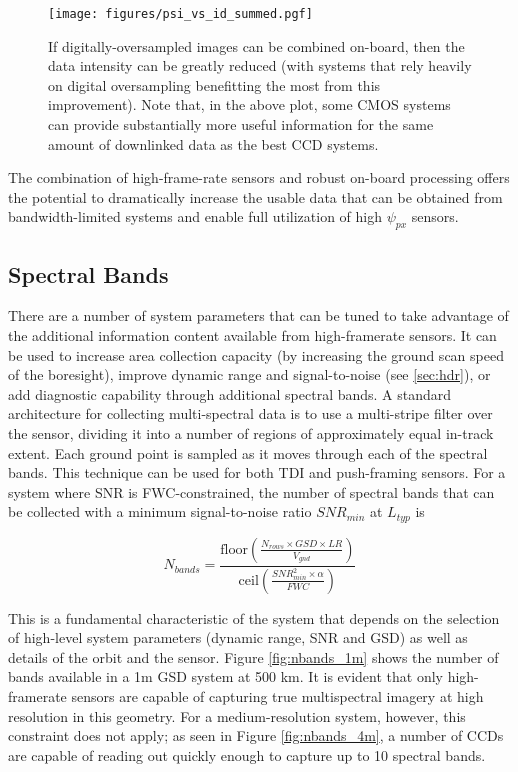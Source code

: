 \documentclass[10pt,journal]{IEEEtran}  %
\begin{document}
\begin{figure}
  \texttt{[image: figures/psi\_vs\_id\_summed.pgf]}
  \caption{If digitally-oversampled images can be combined on-board, then the data intensity can be greatly reduced (with systems that rely heavily on digital oversampling benefitting the most from this improvement). Note that, in the above plot, some CMOS systems can provide substantially more useful information for the same amount of downlinked data as the best CCD systems.
  \label{fig:psi_vs_id_summed}}
\end{figure}

The combination of high-frame-rate sensors and robust on-board processing offers the potential to dramatically increase the usable data that can be obtained from bandwidth-limited systems and enable full utilization of high $\psi_{px}$ sensors.

\subsection{Spectral Bands}
\label{sec:spec}

There are a number of system parameters that can be tuned to take advantage of the additional information content available from high-framerate sensors. It can be used to increase area collection capacity (by increasing the ground scan speed of the boresight), improve dynamic range and signal-to-noise (see \ref{sec:hdr}), or add diagnostic capability through additional spectral bands. A standard architecture for collecting multi-spectral data is to use a multi-stripe filter over the sensor, dividing it into a number of regions of approximately equal in-track extent. Each ground point is sampled as it moves through each of the spectral bands. This technique can be used for both TDI and push-framing sensors. For a system where SNR is FWC-constrained, the number of spectral bands that can be collected with a minimum signal-to-noise ratio $SNR_{min}$ at $L_{typ}$ is

\begin{equation}
    \label{eq:nbands}
    N_{bands} = \frac{\text{floor}\left(\frac{N_{rows}\times GSD\times LR}{V_{gnd}}\right)} {\text{ceil}\left(\frac{SNR_{min}^{2}\times\alpha}{FWC}\right)}
\end{equation}

This is a fundamental characteristic of the system that depends on the selection of high-level system parameters (dynamic range, SNR and GSD) as well as details of the orbit and the sensor. Figure \ref{fig:nbands_1m} shows the number of bands available in a 1m GSD system at 500 km. It is evident that only high-framerate sensors are capable of capturing true multispectral imagery at high resolution in this geometry. For a medium-resolution system, however, this constraint does not apply; as seen in Figure \ref{fig:nbands_4m}, a number of CCDs are capable of reading out quickly enough to capture up to 10 spectral bands.
\end{document}
